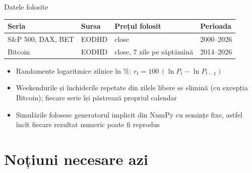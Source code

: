 \begin{frame}{Datele folosite}
\itemsize{\small}
\begin{center}
\footnotesize
\begin{tabular}{llll}
\toprule
\textbf{Seria} & \textbf{Sursa} & \textbf{Prețul folosit} & \textbf{Perioada} \\
\midrule
S\&P 500, DAX, BET & EODHD & close & 2000--2026 \\
Bitcoin & EODHD & close, 7 zile pe săptămînă & 2014--2026 \\
\bottomrule
\end{tabular}
\end{center}
\begin{itemize}
    \item Randamente logaritmice zilnice în \%: $r_t = 100\,(\ln P_t - \ln P_{t-1})$
    \item Weekendurile și închiderile repetate din zilele libere se elimină (cu excepția Bitcoin); fiecare serie își păstrează propriul calendar
    \item Simulările folosesc generatorul implicit din NumPy cu semințe fixe, astfel încît fiecare rezultat numeric poate fi reprodus
\end{itemize}
\end{frame}


\section{Noțiuni necesare azi}

